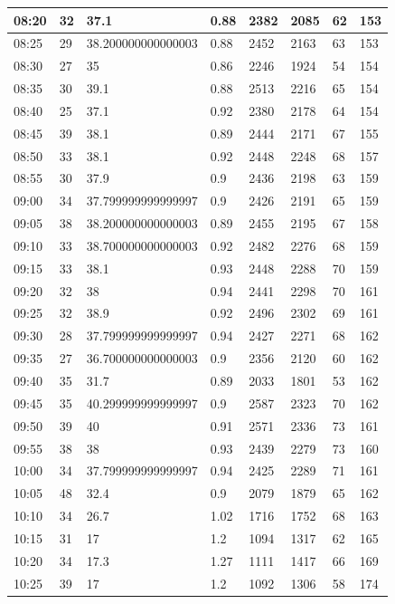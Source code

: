 \documentclass[
]{book}
\begin{document}
\begin{tabular}{l|l|l|l|l|l|l|l}
\hline
08:20 & 32 & 37.1 & 0.88 & 2382 & 2085 & 62 & 153\\
\hline
08:25 & 29 & 38.200000000000003 & 0.88 & 2452 & 2163 & 63 & 153\\
\hline
08:30 & 27 & 35 & 0.86 & 2246 & 1924 & 54 & 154\\
\hline
08:35 & 30 & 39.1 & 0.88 & 2513 & 2216 & 65 & 154\\
\hline
08:40 & 25 & 37.1 & 0.92 & 2380 & 2178 & 64 & 154\\
\hline
08:45 & 39 & 38.1 & 0.89 & 2444 & 2171 & 67 & 155\\
\hline
08:50 & 33 & 38.1 & 0.92 & 2448 & 2248 & 68 & 157\\
\hline
08:55 & 30 & 37.9 & 0.9 & 2436 & 2198 & 63 & 159\\
\hline
09:00 & 34 & 37.799999999999997 & 0.9 & 2426 & 2191 & 65 & 159\\
\hline
09:05 & 38 & 38.200000000000003 & 0.89 & 2455 & 2195 & 67 & 158\\
\hline
09:10 & 33 & 38.700000000000003 & 0.92 & 2482 & 2276 & 68 & 159\\
\hline
09:15 & 33 & 38.1 & 0.93 & 2448 & 2288 & 70 & 159\\
\hline
09:20 & 32 & 38 & 0.94 & 2441 & 2298 & 70 & 161\\
\hline
09:25 & 32 & 38.9 & 0.92 & 2496 & 2302 & 69 & 161\\
\hline
09:30 & 28 & 37.799999999999997 & 0.94 & 2427 & 2271 & 68 & 162\\
\hline
09:35 & 27 & 36.700000000000003 & 0.9 & 2356 & 2120 & 60 & 162\\
\hline
09:40 & 35 & 31.7 & 0.89 & 2033 & 1801 & 53 & 162\\
\hline
09:45 & 35 & 40.299999999999997 & 0.9 & 2587 & 2323 & 70 & 162\\
\hline
09:50 & 39 & 40 & 0.91 & 2571 & 2336 & 73 & 161\\
\hline
09:55 & 38 & 38 & 0.93 & 2439 & 2279 & 73 & 160\\
\hline
10:00 & 34 & 37.799999999999997 & 0.94 & 2425 & 2289 & 71 & 161\\
\hline
10:05 & 48 & 32.4 & 0.9 & 2079 & 1879 & 65 & 162\\
\hline
10:10 & 34 & 26.7 & 1.02 & 1716 & 1752 & 68 & 163\\
\hline
10:15 & 31 & 17 & 1.2 & 1094 & 1317 & 62 & 165\\
\hline
10:20 & 34 & 17.3 & 1.27 & 1111 & 1417 & 66 & 169\\
\hline
10:25 & 39 & 17 & 1.2 & 1092 & 1306 & 58 & 174\\

\end{tabular}
\end{document}
